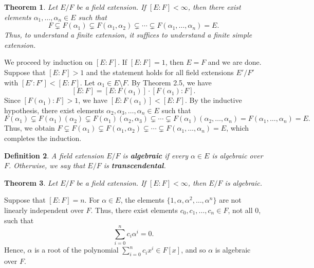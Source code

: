 \documentclass[10pt]{article}
\makeatletter
\theoremstyle{newstyle}
\newtheorem{thm}{Theorem}[section]
\newtheorem{defn}[thm]{Definition}
\newenvironment{pf}[1][\proofname]{\par
  \pushQED{\qed}%
  \normalfont \topsep0\p@\relax
  \trivlist
  \item[\hskip\labelsep\scshape
  #1\@addpunct{.}]\ignorespaces
}{%
  \popQED\endtrivlist\@endpefalse
}
\makeatother
\begin{document}
\begin{thm}
Let $E/F$ be a field extension. If $[E : F] < \infty$, then there exist elements 
$\alpha_1, \dots, \alpha_n \in E$ such that 
\[ F \subsetneq F(\alpha_1) \subsetneq F(\alpha_1, \alpha_2) \subsetneq \cdots 
\subsetneq F(\alpha_1, \dots, \alpha_n) = E. \]
Thus, to understand a finite extension, it suffices to understand a finite simple extension.
\end{thm}
\begin{pf}
We proceed by induction on $[E : F]$. If $[E : F] = 1$, then $E = F$ and we are done. 
Suppose that $[E : F] > 1$ and the statement holds for all field extensions $E'/F'$ 
with $[E' : F'] < [E : F]$. Let $\alpha_1 \in E \setminus F$. By Theorem 2.5, we have 
\[ [E : F] = [E : F(\alpha_1)] \cdot [F(\alpha_1) : F]. \]
Since $[F(\alpha_1) : F] > 1$, we have $[E : F(\alpha_1)] < [E : F]$. By the inductive hypothesis, 
there exist elements $\alpha_2, \alpha_3, \dots, \alpha_n \in E$ such that 
\[ F(\alpha_1) \subsetneq F(\alpha_1)(\alpha_2) \subsetneq F(\alpha_1)(\alpha_2, 
\alpha_3) \subsetneq \cdots 
\subsetneq F(\alpha_1)(\alpha_2, \dots, \alpha_n) = F(\alpha_1, \dots, \alpha_n) = E. \]
Thus, we obtain 
$F \subsetneq F(\alpha_1) \subsetneq F(\alpha_1, \alpha_2) \subsetneq \cdots 
\subsetneq F(\alpha_1, \dots, \alpha_n) = E$,
which completes the induction.
\end{pf}

\begin{defn}
A field extension $E/F$ is {\bf algebraic} if every $\alpha \in E$ is algebraic over $F$. 
Otherwise, we say that $E/F$ is {\bf transcendental}.
\end{defn}

\begin{thm}
Let $E/F$ be a field extension. If $[E : F] < \infty$, then $E/F$ is algebraic.
\end{thm}
\begin{pf}
Suppose that $[E : F] = n$. For $\alpha \in E$, the elements $\{1, \alpha, \alpha^2, \dots, \alpha^n\}$
are not linearly independent over $F$. Thus, there exist elements $c_0, c_1, \dots, c_n \in F$, 
not all $0$, such that 
\[ \sum_{i=0}^n c_i\alpha^i = 0. \]
Hence, $\alpha$ is a root of the polynomial $\sum_{i=0}^n c_i x^i \in F[x]$, and so 
$\alpha$ is algebraic over $F$.
\end{pf}
\end{document}
